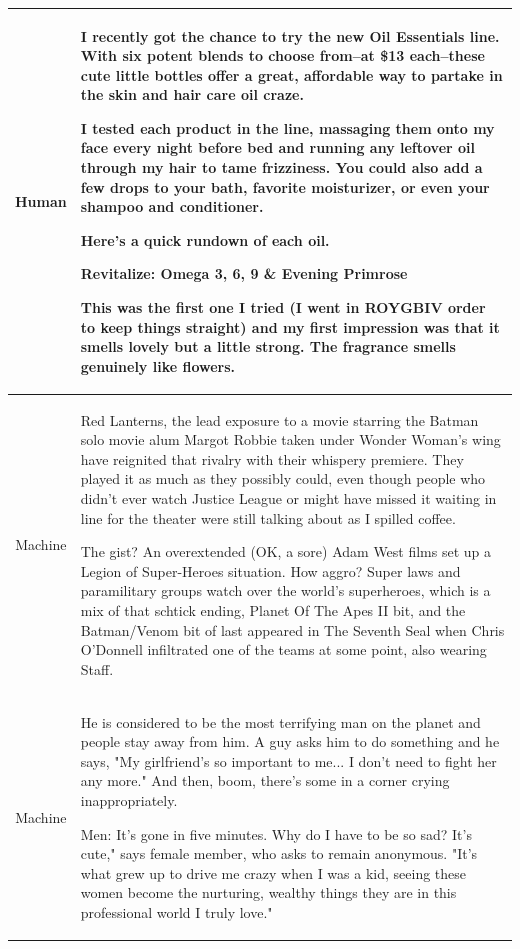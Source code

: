\begin{table}[]
    \centering
    \tiny
    \begin{tabular}{c|p{5.5in}}
    \hline
Human & I recently got the chance to try the new Oil Essentials line. With six potent blends to choose from--at \$13 each--these cute little bottles offer a great, affordable way to partake in the skin and hair care oil craze.

I tested each product in the line, massaging them onto my face every night before bed and running any leftover oil through my hair to tame frizziness. You could also add a few drops to your bath, favorite moisturizer, or even your shampoo and conditioner.

Here's a quick rundown of each oil.

Revitalize: Omega 3, 6, 9 \& Evening Primrose

This was the first one I tried (I went in ROYGBIV order to keep things straight) and my first impression was that it smells lovely but a little strong. The fragrance smells genuinely like flowers.
\\
\hline
Machine
&
Red Lanterns, the lead exposure to a movie starring the Batman solo movie alum Margot Robbie taken under Wonder Woman's wing have reignited that rivalry with their whispery premiere. They played it as much as they possibly could, even though people who didn't ever watch Justice League or might have missed it waiting in line for the theater were still talking about as I spilled coffee.

The gist? An overextended (OK, a sore) Adam West films set up a Legion of Super-Heroes situation. How aggro? Super laws and paramilitary groups watch over the world's superheroes, which is a mix of that schtick ending, Planet Of The Apes II bit, and the Batman/Venom bit of last appeared in The Seventh Seal when Chris O'Donnell infiltrated one of the teams at some point, also wearing Staff.
\\
\hline
Machine
&
He is considered to be the most terrifying man on the planet and people stay away from him. A guy asks him to do something and he says, "My girlfriend's so important to me... I don't need to fight her any more." And then, boom, there's some in a corner crying inappropriately.

Men: It's gone in five minutes. Why do I have to be so sad? It's cute," says female member, who asks to remain anonymous. "It's what grew up to drive me crazy when I was a kid, seeing these women become the nurturing, wealthy things they are in this professional world I truly love."


\end{tabular}
\end{table}
